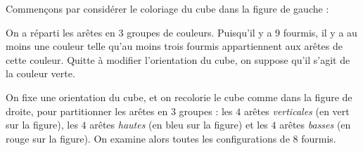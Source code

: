 Commençons par considérer le coloriage du cube dans la figure de gauche :


\begin{center}
\hfill
{}
\end{center}


On a réparti les arêtes en $3$ groupes de couleurs. Puisqu'il y a $9$ fourmis, il y a au moins une couleur telle qu'au moins trois fourmis appartiennent aux arêtes de cette couleur. Quitte à modifier l'orientation du cube, on suppose qu'il s'agit de la couleur verte.

\medskip

On fixe une orientation du cube, et on recolorie le cube comme dans la figure de droite, pour partitionner les arêtes en $3$ groupes : les $4$ arêtes \textit{verticales} (en vert sur la figure), les $4$ arêtes \textit{hautes} (en bleu sur la figure) et les $4$ arêtes \textit{basses} (en rouge sur la figure). On examine alors toutes les configurations de $8$ fourmis.

